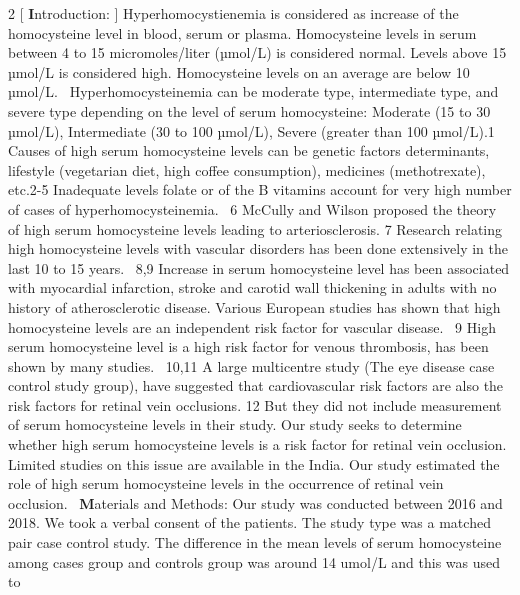 \documentclass{article}
\begin{document}
\hrulefill
\newline
\begin{multicols*}{2}
[
\textbf Introduction:
]
Hyperhomocystienemia is considered as increase of the
homocysteine level in blood, serum or plasma.
Homocysteine levels in serum between 4 to 15
micromoles/liter (µmol/L) is considered normal. Levels
above 15 µmol/L is considered high. Homocysteine levels
on an average are below 10 µmol/L.~\cite{b} Hyperhomocysteinemia
can be moderate type, intermediate type, and severe type
depending on the level of serum homocysteine: Moderate
(15 to 30 µmol/L), Intermediate (30 to 100 µmol/L), Severe
(greater than 100 µmol/L).1
Causes of high serum homocysteine levels can be
genetic factors determinants, lifestyle (vegetarian diet, high
coffee consumption), medicines (methotrexate), etc.2-5
Inadequate levels folate or of the B vitamins account for
very high number of cases of hyperhomocysteinemia.~\cite{b}
6
McCully and Wilson proposed the theory of high serum
homocysteine levels leading to arteriosclerosis.
7 Research
relating high homocysteine levels with vascular disorders
has been done extensively in the last 10 to 15 years.~\cite{a}
8,9
Increase in serum homocysteine level has been associated
with myocardial infarction, stroke and carotid wall
thickening in adults with no history of atherosclerotic
disease. Various European studies has shown that high
homocysteine levels are an independent risk factor for
vascular disease.~\cite{a}
9 High serum homocysteine level is a high
risk factor for venous thrombosis, has been shown by many
studies.~\cite{d}
10,11 A large multicentre study (The eye disease case
control study group), have suggested that cardiovascular
risk factors are also the risk factors for retinal vein
occlusions.
12 But they did not include measurement of
serum homocysteine levels in their study. Our study seeks to determine whether high serum homocysteine levels is a risk
factor for retinal vein occlusion. Limited studies on this
issue are available in the India. Our study estimated the role
of high serum homocysteine levels in the occurrence of
retinal vein occlusion.~\cite{c}
\newline
\newline
\textbf Materials and Methods:
\newline
Our study was conducted between 2016 and 2018. We
took a verbal consent of the patients. The study type was a
matched pair case control study. The difference in the mean
levels of serum homocysteine among cases group and
controls group was around 14 umol/L and this was used to

\end{multicols*}
\end{document}
